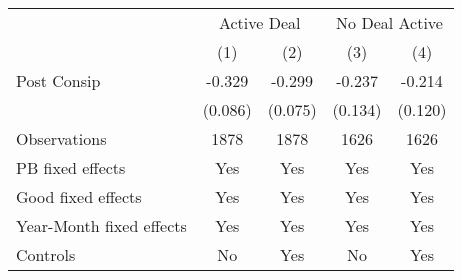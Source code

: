 \begin{tabular}{l*{4}{c}}
\hline\hline
                    &\multicolumn{2}{c}{Active Deal}&\multicolumn{2}{c}{No Deal Active}\\\cmidrule(lr){2-3}\cmidrule(lr){4-5}
                    &\multicolumn{1}{c}{(1)}&\multicolumn{1}{c}{(2)}&\multicolumn{1}{c}{(3)}&\multicolumn{1}{c}{(4)}\\
\hline
Post Consip         &      -0.329&      -0.299&      -0.237&      -0.214\\
                    &     (0.086)&     (0.075)&     (0.134)&     (0.120)\\
\hline
Observations        &        1878&        1878&        1626&        1626\\
PB fixed effects    &         Yes&         Yes&         Yes&         Yes\\
Good fixed effects  &         Yes&         Yes&         Yes&         Yes\\
Year-Month fixed effects&         Yes&         Yes&         Yes&         Yes\\
Controls            &          No&         Yes&          No&         Yes\\
\hline\hline
\end{tabular}
